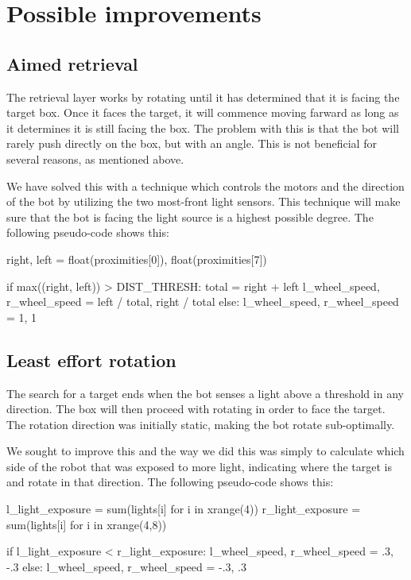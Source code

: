 \documentclass[a4paper,10pt]{article}
\begin{document}
\clearpage

\section{Possible improvements}
\label{sec:b1}

\subsection{Aimed retrieval}

The retrieval layer works by rotating until it has determined that it is 
facing the target box. Once it faces the target, it will commence moving 
farward as long as it determines it is still facing the box. The problem with 
this is that the bot will rarely push directly on the box, but with an angle.  
This is not beneficial for several reasons, as mentioned above.

We have solved this with a technique which controls the motors and the 
direction of the bot by utilizing the two most-front light sensors. This 
technique will make sure that the bot is facing the light source is a highest 
possible degree. The following pseudo-code shows this:

\begin{python}
right, left = float(proximities[0]), float(proximities[7])

if max((right, left)) > DIST_THRESH:
    total = right + left
    l_wheel_speed, r_wheel_speed = left / total, right / total
else:
    l_wheel_speed, r_wheel_speed = 1, 1
\end{python}

\subsection{Least effort rotation}

The search for a target ends when the bot senses a light above a threshold in 
any direction. The box will then proceed with rotating in order to face the 
target. The rotation direction was initially static, making the bot rotate 
sub-optimally.

We sought to improve this and the way we did this was simply to calculate 
which side of the robot that was exposed to more light, indicating where the 
target is and rotate in that direction. The following pseudo-code shows this:

\begin{python}
l_light_exposure = sum(lights[i] for i in xrange(4))
r_light_exposure = sum(lights[i] for i in xrange(4,8))

if l_light_exposure < r_light_exposure:
    l_wheel_speed, r_wheel_speed = .3, -.3
else:
    l_wheel_speed, r_wheel_speed = -.3, .3
\end{python}
\end{document}
